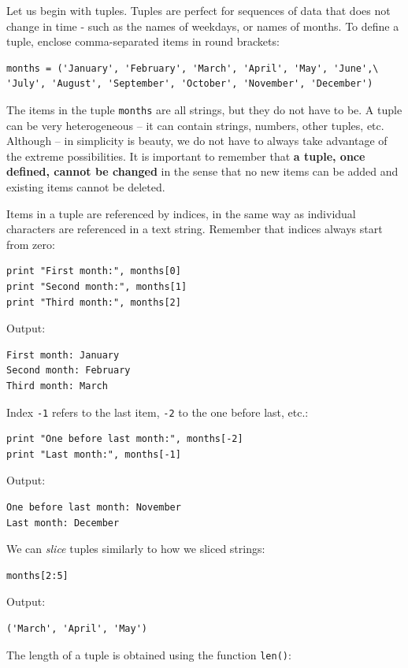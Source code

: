 Let us begin with tuples. Tuples are perfect for sequences 
of data that does not change in time - such as 
the names of weekdays, or names of months. To define a tuple, 
enclose comma-separated items in round brackets:

\begin{verbatim}
months = ('January', 'February', 'March', 'April', 'May', 'June',\
'July', 'August', 'September', 'October', 'November', 'December')
\end{verbatim}
The items in the tuple {\tt months} are all strings, but they do not
have to be. A tuple can be very heterogeneous -- it can contain strings,
numbers, other tuples, etc. Although -- in simplicity is beauty, we
do not have to always take advantage of the extreme possibilities.
It is important to remember that {\bf a tuple, once defined, cannot 
be changed} in the sense that no new items can be added and existing 
items cannot be deleted.

Items in a tuple are referenced by indices, in the same way as individual 
characters are referenced in a text string. Remember that indices always 
start from zero:

\begin{verbatim}
print "First month:", months[0]
print "Second month:", months[1]
print "Third month:", months[2]
\end{verbatim}
Output:

\begin{verbatim}
First month: January
Second month: February
Third month: March
\end{verbatim}
Index {\tt -1} refers to the last item, {\tt -2} to the one before last, etc.:

\begin{verbatim}
print "One before last month:", months[-2]
print "Last month:", months[-1]
\end{verbatim}
Output:

\begin{verbatim}
One before last month: November
Last month: December
\end{verbatim}

\noindent
We can {\em slice} tuples similarly to how we sliced strings:

\begin{verbatim}
months[2:5]
\end{verbatim}
Output:

\begin{verbatim}
('March', 'April', 'May')
\end{verbatim}
The length of a tuple is obtained using the function {\tt len()}:

